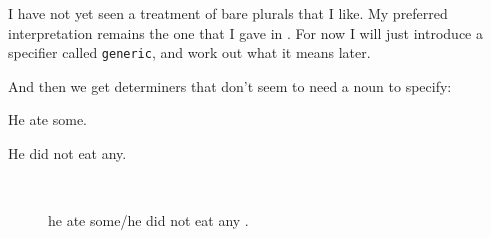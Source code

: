 \documentclass[11pt,a4paper]{article}
\begin{document}
\begin{figure}[ht]
\begin{minipage}[t]{0.45\linewidth}
{{   }
}
\end{minipage}
\hspace*{\fill}
\caption{}\label{he does not like unripe ones .}
\end{figure}

\medpara
I have not yet seen a treatment of bare plurals that I like. My
preferred interpretation remains the one that I gave in
\citep{Ramsay:92b}. For now I will just introduce a specifier called
\texttt{generic}, and work out what it means later.

And then we get determiners that don't seem to need a noun to specify:

\begin{examples}
\item 
\begin{examples}
\item He ate some.
\item He did not eat any.
\end{examples}
\end{examples}

\begin{figure}[ht]
\hbox{
\hspace{0.5in}
}
\caption{he ate some/he did not eat any .}\label{he ate some/he did not eat any .}
\end{figure}
\end{document}
